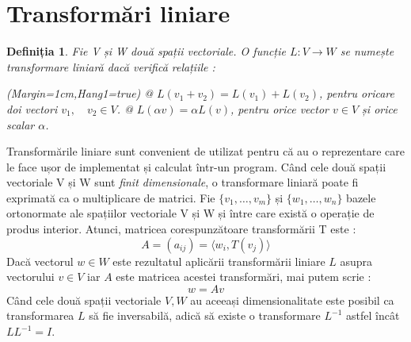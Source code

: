 \section{Transformări liniare}
\newtheorem{th_linear_transforms}{Definiția}
\begin{th_linear_transforms}
Fie V și W două spații vectoriale. O funcție $L : V \rightarrow W$ se numește
transformare liniară dacă verifică relațiile :
\begin{easylist}
\ListProperties(Margin=1cm,Hang1=true)
@ $L(v_{1} + v_{2}) = L(v_{1}) + L(v_{2})$, pentru oricare doi vectori 
    $v_{1}, \quad v_{2} \in V$.
@ $L(\alpha v) = \alpha L(v)$, pentru orice vector $v \in V$ și orice scalar 
$\alpha$.    
\end{easylist}
\end{th_linear_transforms}
Transformările liniare sunt convenient de utilizat pentru că au o reprezentare
care le face ușor de implementat și calculat într-un program. Când cele două
spații vectoriale V și W sunt \textit{finit dimensionale}, o transformare 
liniară poate fi exprimată ca o multiplicare de matrici. 
Fie $\{v_{1}, \dots , v_{m}\}$ și $\{w_{1}, \dots , w_{n}\}$ bazele ortonormate ale
spațiilor vectoriale V și W și între care există o operație de produs interior. 
Atunci, matricea corespunzătoare transformării T este :
\begin{equation}
A = (a_{ij}) = \langle w_{i}, T(v_{j}) \rangle
\end{equation}
Dacă vectorul $w \in W$ este rezultatul aplicării transformării liniare $L$ 
asupra vectorului $v \in V$ iar $A$ este matricea acestei transformări, mai
putem scrie :
\begin{equation}
w = Av
\end{equation}
Când cele două spații vectoriale $V, W$ au aceeași dimensionalitate este posibil
ca transformarea $L$ să fie inversabilă, adică să existe o transformare $L^{-1}$
astfel încât $LL^{-1} = I$.